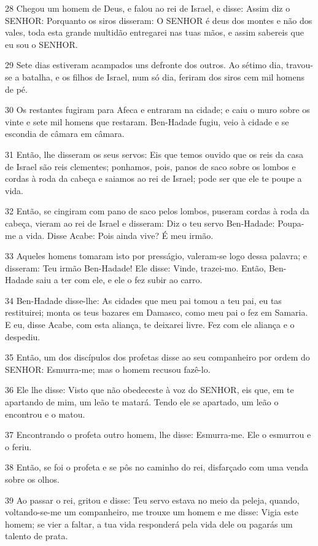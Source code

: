 \par 28 Chegou um homem de Deus, e falou ao rei de Israel, e disse: Assim diz o SENHOR: Porquanto os siros disseram: O SENHOR é deus dos montes e não dos vales, toda esta grande multidão entregarei nas tuas mãos, e assim sabereis que eu sou o SENHOR.
\par 29 Sete dias estiveram acampados uns defronte dos outros. Ao sétimo dia, travou-se a batalha, e os filhos de Israel, num só dia, feriram dos siros cem mil homens de pé.
\par 30 Os restantes fugiram para Afeca e entraram na cidade; e caiu o muro sobre os vinte e sete mil homens que restaram. Ben-Hadade fugiu, veio à cidade e se escondia de câmara em câmara.
\par 31 Então, lhe disseram os seus servos: Eis que temos ouvido que os reis da casa de Israel são reis clementes; ponhamos, pois, panos de saco sobre os lombos e cordas à roda da cabeça e saiamos ao rei de Israel; pode ser que ele te poupe a vida.
\par 32 Então, se cingiram com pano de saco pelos lombos, puseram cordas à roda da cabeça, vieram ao rei de Israel e disseram: Diz o teu servo Ben-Hadade: Poupa-me a vida. Disse Acabe: Pois ainda vive? É meu irmão.
\par 33 Aqueles homens tomaram isto por presságio, valeram-se logo dessa palavra; e disseram: Teu irmão Ben-Hadade! Ele disse: Vinde, trazei-mo. Então, Ben-Hadade saiu a ter com ele, e ele o fez subir ao carro.
\par 34 Ben-Hadade disse-lhe: As cidades que meu pai tomou a teu pai, eu tas restituirei; monta os teus bazares em Damasco, como meu pai o fez em Samaria. E eu, disse Acabe, com esta aliança, te deixarei livre. Fez com ele aliança e o despediu.
\par 35 Então, um dos discípulos dos profetas disse ao seu companheiro por ordem do SENHOR: Esmurra-me; mas o homem recusou fazê-lo.
\par 36 Ele lhe disse: Visto que não obedeceste à voz do SENHOR, eis que, em te apartando de mim, um leão te matará. Tendo ele se apartado, um leão o encontrou e o matou.
\par 37 Encontrando o profeta outro homem, lhe disse: Esmurra-me. Ele o esmurrou e o feriu.
\par 38 Então, se foi o profeta e se pôs no caminho do rei, disfarçado com uma venda sobre os olhos.
\par 39 Ao passar o rei, gritou e disse: Teu servo estava no meio da peleja, quando, voltando-se-me um companheiro, me trouxe um homem e me disse: Vigia este homem; se vier a faltar, a tua vida responderá pela vida dele ou pagarás um talento de prata.

